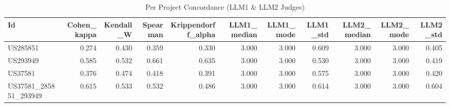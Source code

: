 \begin{table}
\caption{Per Project Concordance (LLM1 & LLM2 Judges)}
\label{tab:per_project_concordance_LLM_judges}
\begin{tabular}{lrrrrrrrrrr}
\toprule
Id & Cohen_kappa & Kendall_W & Spearman & Krippendorff_alpha & LLM1_median & LLM1_mode & LLM1_std & LLM2_median & LLM2_mode & LLM2_std \\
\midrule
US285851 & 0.274 & 0.430 & 0.359 & 0.330 & 3.000 & 3.000 & 0.609 & 3.000 & 3.000 & 0.405 \\
US293949 & 0.585 & 0.532 & 0.661 & 0.635 & 3.000 & 3.000 & 0.530 & 3.000 & 3.000 & 0.419 \\
US37581 & 0.376 & 0.474 & 0.418 & 0.391 & 3.000 & 3.000 & 0.575 & 3.000 & 3.000 & 0.420 \\
US37581_285851_293949 & 0.615 & 0.533 & 0.532 & 0.486 & 3.000 & 3.000 & 0.614 & 3.000 & 3.000 & 0.604 \\
\bottomrule
\end{tabular}
\end{table}
